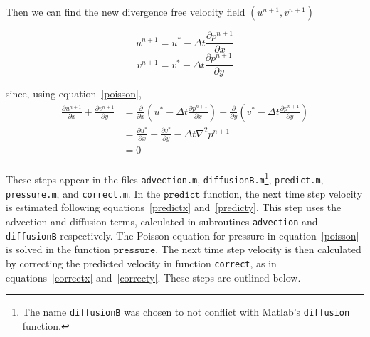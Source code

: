 \documentclass[12pt]{article}
\begin{document}
Then we can find the new divergence free velocity field $(u^{n+1},v^{n+1})$ 

\begin{equation}
u^{n+1}= u^* - \Delta t\frac{\partial p^{n+1}}{\partial x}
\label{correctx}
\end{equation}
\begin{equation}
v^{n+1}= v^* - \Delta t\frac{\partial p^{n+1}}{\partial y}
\label{correcty}
\end{equation}

since, using equation~\ref{poisson},
\begin{align*}
\frac{\partial  u^{n+1}}{\partial x} +  \frac{\partial  v^{n+1}}{\partial y}&= \frac{\partial}{\partial x}\left(u^* - \Delta t\frac{\partial p^{n+1}}{\partial x} \right) + \frac{\partial}{\partial y}\left(v^* - \Delta t\frac{\partial p^{n+1}}{\partial y} \right)\\
&= \frac{\partial u^*}{\partial x} + \frac{\partial v^*}{\partial y} - \Delta t\nabla^2p^{n+1} \\
&= 0 \\
\end{align*}

These steps appear in the files \texttt{advection.m}, \texttt{diffusionB.m}\footnote{The name \texttt{diffusionB} was chosen to not conflict with Matlab's \texttt{diffusion} function.}, \texttt{predict.m}, \texttt{pressure.m}, and \texttt{correct.m}.  In the $\texttt{predict}$ function, the next time step velocity is estimated following equations~\ref{predictx} and~\ref{predicty}.  This step uses the advection and diffusion terms, calculated in subroutines \texttt{advection} and \texttt{diffusionB} respectively.  The Poisson equation for pressure in equation~\ref{poisson} is solved in the function $\texttt{pressure}$.  The next time step velocity is then calculated by correcting the predicted velocity in function \texttt{correct}, as in equations~\ref{correctx} and~\ref{correcty}.  These steps are outlined below.
\end{document}
